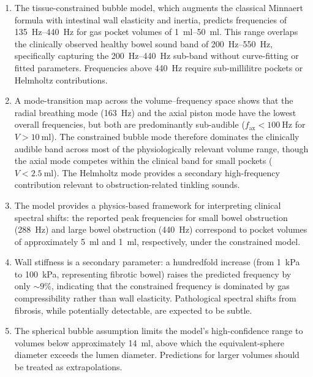 \documentclass[review]{elsarticle}
\begin{document}
\begin{enumerate}
  \item The tissue-constrained bubble model, which augments the classical
    Minnaert formula with intestinal wall elasticity and inertia, predicts
    frequencies of \SIrange{135}{440}{\hertz} for gas pocket volumes of
    \SIrange{1}{50}{\milli\litre}.  This range overlaps the clinically
    observed healthy bowel sound band of \SIrange{200}{550}{\hertz},
    specifically capturing the \SIrange{200}{440}{\hertz} sub-band without
    curve-fitting or fitted parameters.  Frequencies above
    \SI{440}{\hertz} require sub-millilitre pockets or Helmholtz
    contributions.

  \item A mode-transition map across the volume--frequency space shows that
    the radial breathing mode (\SI{163}{\hertz}) and the axial piston mode
    have the lowest overall frequencies, but both are predominantly
    sub-audible ($f_\mathrm{ax} < \SI{100}{\hertz}$ for $V >
    \SI{10}{\milli\litre}$).  The constrained bubble mode therefore dominates
    the clinically audible band across most of the physiologically relevant
    volume range, though the axial mode competes within the clinical band
    for small pockets ($V < \SI{2.5}{\milli\litre}$).  The
    Helmholtz mode provides a secondary high-frequency contribution
    relevant to obstruction-related tinkling sounds.

  \item The model provides a physics-based framework for interpreting
    clinical spectral shifts: the reported peak frequencies for small bowel
    obstruction (\SI{288}{\hertz}) and large bowel obstruction
    (\SI{440}{\hertz}) correspond to pocket volumes of approximately
    \SI{5}{\milli\litre} and \SI{1}{\milli\litre}, respectively, under the
    constrained model.

  \item Wall stiffness is a secondary parameter: a hundredfold increase
    (from \SI{1}{\kilo\pascal} to \SI{100}{\kilo\pascal}, representing
    fibrotic bowel) raises the predicted frequency by only ${\sim}9\%$,
    indicating that the constrained frequency is dominated by gas
    compressibility rather than wall elasticity.  Pathological spectral
    shifts from fibrosis, while potentially detectable, are expected to
    be subtle.

  \item The spherical bubble assumption limits the model's high-confidence
    range to volumes below approximately \SI{14}{\milli\litre}, above which
    the equivalent-sphere diameter exceeds the lumen diameter.  Predictions
    for larger volumes should be treated as extrapolations.
\end{enumerate}
\end{document}
